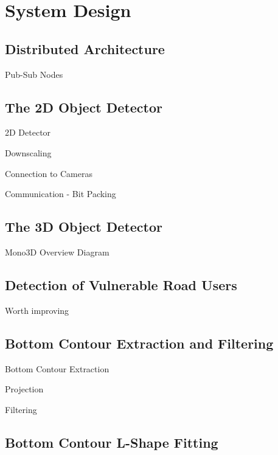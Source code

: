 
\chapter{System Design}
\label{ch:system}

\section{Distributed Architecture}
\label{sec:arch}

Pub-Sub Nodes


\section{The 2D Object Detector}
\label{sec:segmentation}

2D Detector \par
Downscaling \par
Connection to Cameras \par
Communication - Bit Packing

\section{The 3D Object Detector}
\label{sec:mono3doverview}

Mono3D Overview Diagram

\section{Detection of Vulnerable Road Users}
\label{sec:pedcyc}

Worth improving


\section{Bottom Contour Extraction and Filtering}
\label{sec:botcont}

Bottom Contour Extraction \par
Projection \par
Filtering

\section{Bottom Contour L-Shape Fitting}
\label{sec:botcontlsf}

